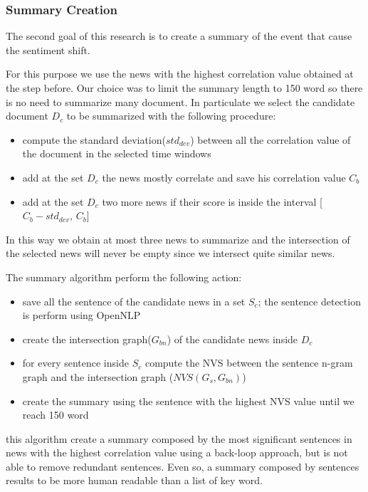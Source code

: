 \subsubsection*{Summary Creation}
The second goal of this research is to create a summary of the event that cause the sentiment shift. 

For this purpose we use the news with the highest correlation value obtained at the step before.
Our choice was to limit the summary length to 150 word so there is no need to summarize many document. 
In particulate we select the candidate document $D_c$ to be summarized with the following procedure:
\begin{itemize}
	\item compute the standard deviation($std_{dev}$) between all the correlation value of the document in the selected time windows
	\item add at the set $D_c$ the news mostly correlate and save his correlation value $C_b$
	\item add at the set $D_c$ two more news if their score is inside the interval [$C_b - std_{dev}$, $C_b$]
\end{itemize}
In this way we obtain at most three news to summarize and the intersection of the selected news will never be empty since we intersect quite similar news.

The summary algorithm perform the following action:
\begin{itemize}
	\item save all the sentence of the candidate news in a set $S_c$; the sentence detection is perform using OpenNLP
	\item create the intersection graph($G_{bn}$) of the candidate news inside $D_c$
	\item for every sentence inside $S_c$ compute the NVS between the sentence n-gram graph and the intersection graph ($NVS( G_{s}, G_{bn} )$)
	\item create the summary using the sentence with the highest NVS value until we reach 150 word
\end{itemize}
this algorithm create a summary composed by the most significant sentences in news with the highest correlation value using a back-loop approach, but is not able to remove redundant sentences. Even so, a summary composed by sentences results to be more human readable than a list of key word.
